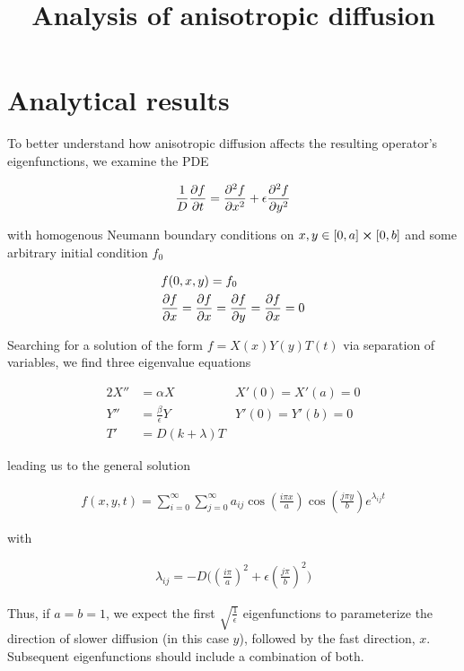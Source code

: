 \documentclass[11pt]{article}
\title{Analysis of anisotropic diffusion}
\begin{document}
\maketitle

\section{Analytical results}

To better understand how anisotropic diffusion affects the resulting
operator's eigenfunctions, we examine the PDE

\begin{align}
  &\frac{1}{D} \pdv{f}{t} = \pdv[2]{f}{x} + \epsilon \pdv[2]{f}{y} \\
\end{align}

with homogenous Neumann boundary conditions on $x,y \in
[0,a]\cross[0,b]$ and some arbitrary initial condition $f_0$

\begin{align}
  &f(0,x,y)=f_0 \\
  &\pdv{f}{x} (t,0,y)=\pdv{f}{x} (t,a,y)=\pdv{f}{y} (t,x,0)=\pdv{f}{x}
    (t,x,b)=0
\end{align}

Searching for a solution of the form $f=X(x)Y(y)T(t)$ via separation
of variables, we find three eigenvalue equations

\begin{alignat}{2}
  X'' &= \alpha X  & X'(0) = X'(a) = 0 \\
  Y'' &= \frac{\beta}{\epsilon} Y & Y'(0) = Y'(b) = 0 \\
  T' &= D (k+\lambda) T &
\end{alignat}

leading us to the general solution

\begin{align}
  f(x,y,t) = \sum_{i=0}^{\infty}\sum_{j=0}^{\infty} a_{ij} \cos(\frac{i \pi x}{a})
  \cos(\frac{j \pi y}{b}) e^{\lambda_{ij} t}
\end{align}

with 

\begin{align}
  \lambda_{ij} = -D \bigg( (\frac{i \pi}{a})^2 + \epsilon (\frac{j
  \pi}{b})^2 \bigg)
\end{align}

Thus, if $a = b = 1$, we expect the first $\sqrt{\frac{1}{\epsilon}}$
eigenfunctions to parameterize the direction of slower diffusion (in
this case $y$), followed by the fast direction, $x$. Subsequent
eigenfunctions should include a combination of both.
\end{document}

